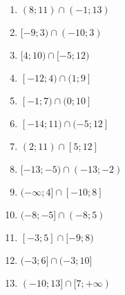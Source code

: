 \documentclass[12pt,a4paper]{article}
\begin{document}
\begin{ex}
\begin{enumerate}
		\item $(8;11)\cap(-1;13)$
		\item $[-9;3)\cap(-10;3)$
		\item $[4;10)\cap[-5;12)$
		\item $[-12;4)\cap(1;9]$
		\item $[-1;7)\cap(0;10]$
		\item $[-14;11)\cap(-5;12]$
		\item $(2;11)\cap[5;12]$
		\item $[-13;-5)\cap(-13;-2)$
		\item $(-\infty;4]\cap[-10;8]$
		\item $(-8;-5]\cap(-8;5)$
		\item $[-3;5]\cap[-9;8)$
		\item $(-3;6]\cap(-3;10]$
		\item $(-10;13]\cap[7;+ \infty)$
	\end{enumerate}
\end{ex}
\end{document}
